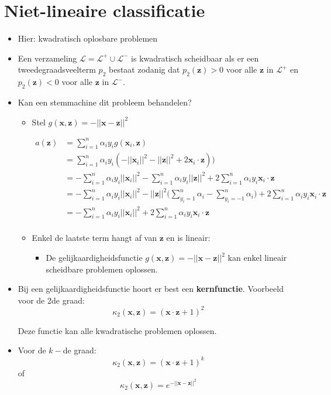 \section{Niet-lineaire classificatie}
\begin{itemize}
    \item Hier: kwadratisch oplosbare problemen
    \item Een verzameling $\mathcal{L} = \mathcal{L}^+ \cup \mathcal{L}^-$ is kwadratisch scheidbaar als er een tweedegraadsveelterm $p_2$ bestaat zodanig dat $p_2(\textbf{z}) > 0$ voor alle $\textbf{z}$ in $\mathcal{L}^+$ en $p_2(\textbf{z}) < 0$ voor alle $\textbf{z}$ in $\mathcal{L}^-$. 
    \item Kan een stemmachine dit probleem behandelen?
    \begin{itemize}
        \item Stel $g(\textbf{x}, \textbf{z}) = - ||\textbf{x} - \textbf{z} ||^2$
        
        \begin{align*}
            a(\textbf{z}) & = \sum_{i = 1}^n \alpha_iy_ig(\textbf{x}_i, \textbf{z})\\
                          & = \sum_{i = 1}^n \alpha_iy_i(- ||\textbf{x}_i||^2 - ||\textbf{z}||^2 + 2\textbf{x}_i\cdot\textbf{z})) \\
                          & = -\sum_{i = 1}^n \alpha_iy_i||\textbf{x}_i||^2 - \sum_{i = 1}^n \alpha_iy_i||\textbf{z}||^2 + 2\sum_{i = 1}^n \alpha_iy_i\textbf{x}_i\cdot\textbf{z} \\
                          & = -\sum_{i = 1}^n \alpha_iy_i||\textbf{x}_i||^2 - ||\textbf{z}||^2\bigg(\sum_{y_{i} = 1}^n \alpha_i - \sum_{y_{i} = -1}^n \alpha_i\bigg) + 2\sum_{i = 1}^n \alpha_iy_i\textbf{x}_i\cdot\textbf{z} \\
                          & = -\sum_{i = 1}^n \alpha_iy_i||\textbf{x}_i||^2  + 2\sum_{i = 1}^n \alpha_iy_i\textbf{x}_i\cdot\textbf{z} \\
        \end{align*}
        \item Enkel de laatste term hangt af van $\textbf{z}$ en is lineair:
        \begin{itemize}
            \item De gelijkaardigheidsfunctie $g(\textbf{x}, \textbf{z}) = - ||\textbf{x} - \textbf{z} ||^2$ kan enkel lineair scheidbare problemen oplossen.
        \end{itemize}
    \end{itemize}
    \item Bij een gelijkaardigheidsfunctie hoort er best een \textbf{kernfunctie}. Voorbeeld voor de 2de graad:
    $$\kappa_2(\textbf{x},  \textbf{z}) = (\textbf{x}\cdot\textbf{z} + 1)^2$$

    Deze functie kan alle kwadratische problemen oplossen.
    \item Voor de $k-$de graad:
    $$\kappa_2(\textbf{x},  \textbf{z}) = (\textbf{x}\cdot\textbf{z} + 1)^k$$
    of
    $$\kappa_2(\textbf{x},  \textbf{z}) = e^{- ||\textbf{x} - \textbf{z} ||^2}$$
\end{itemize}